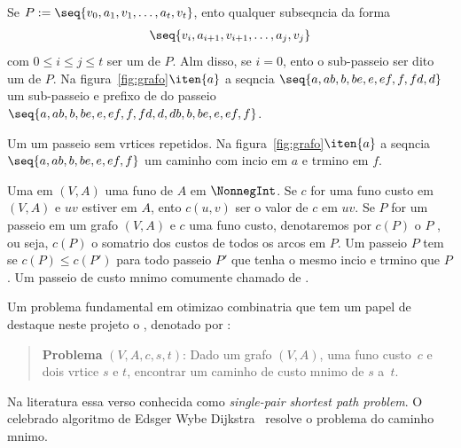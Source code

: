 Se $P:=\seq{v_{0}, a_{1}, v_{1}, \ldots, a_{t}, v_{t}}$, ento qualquer 
subseqncia da forma  
 \begin{eqnarray}
  \label{subpasseio}
   \seq{v_{i}, a_{i+1}, v_{i+1}, \ldots, a_{j}, v_{j}}
 \end{eqnarray}
com $0 \leq i \leq j \leq t$ ser um  de $P$. 
Alm disso, se $i=0$,  ento o sub-passeio ser dito um 
 de $P$.
Na figura~\ref{fig:grafo}$\iten{a}$ a seqncia $\seq{a, ab, b, be, e, ef, f,
fd, d}$  um sub-passeio e prefixo de do passeio 
$\seq{a, ab, b, be, e, ef, f, fd, d, db, b, be, e, ef, f}$.


Um   um passeio
sem vrtices repetidos.
Na figura~\ref{fig:grafo}$\iten{a}$ a seqncia
 $\seq{a, ab, b, be, e, ef, f}$  um caminho com incio em $a$ e 
 trmino em $f$.

 
%
%

Uma  em
$(V,A)$  uma funo de $A$ em $\NonnegInt$. Se $c$ for uma funo
custo em $(V,A)$ e $uv$ estiver em $A$, ento
$c(u,v)$ ser o valor de $c$ em $uv$. 
%
% 
Se $P$ for um passeio em um grafo $(V,A)$ e $c$ uma funo custo, 
denotaremos por $c(P)$ o  $P$%
, ou seja, $c(P)$  o somatrio dos custos
de todos os arcos em $P$.  Um passeio $P$ tem  se
$c(P) \leq c(P')$ para todo passeio $P'$ que tenha o mesmo incio e trmino
que $P$. Um passeio de custo mnimo  comumente chamado de .
 
%
% 
 
Um problema fundamental em otimizao combinatria que tem um papel de
destaque neste projeto  o 
, denotado por
\PCM:
 \begin{quote}
   \textbf{Problema} \PCM$(V,A,c,s,t)$: 
   \index{\PCM}\mar{\PCM}
   Dado um grafo $(V,A)$, uma funo
   custo~$c$ e dois vrtice $s$ e $t$, 
   encontrar um caminho de custo mnimo 
   de $s$ a~$t$.
 \end{quote}
Na literatura essa verso  conhecida como \textit{single-pair shortest path
problem}. 
O celebrado algoritmo de Edsger Wybe Dijkstra~\cite{dijkstra59:note} 
resolve o problema do caminho mnimo.




